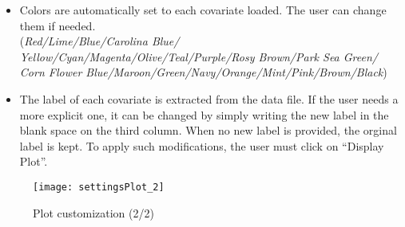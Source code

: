\documentclass[fadttsterUserGuide_use]{subfiles}
\begin{document}
\begin{itemize}
		\begin{itemize}
			\item Colors are automatically set to each covariate loaded. The user can change them if needed.\\
 			(\textit{Red/Lime/Blue/Carolina Blue/ Yellow/Cyan/Magenta/Olive/Teal/Purple/Rosy Brown/Park Sea Green/ Corn Flower Blue/Maroon/Green/Navy/Orange/Mint/Pink/Brown/Black}) 
			\item The label of each covariate is extracted from the data file. If the user needs a more explicit one, it can be changed by simply writing the new label in the blank space on the third column. When no new label is provided, the orginal label is kept. To apply such modifications, the user must click on ``Display Plot''.
		\end{itemize}
	\end{itemize}
	\vfill
	\newpage
	
	\begin{figure}[H]
  		\centering
    	\texttt{[image: settingsPlot\_2]}
    	\caption{Plot customization (2/2)}
    	\label{fig:settingsPlot_2}
    \end{figure}
    \vfill
	\newpage
\end{document}
